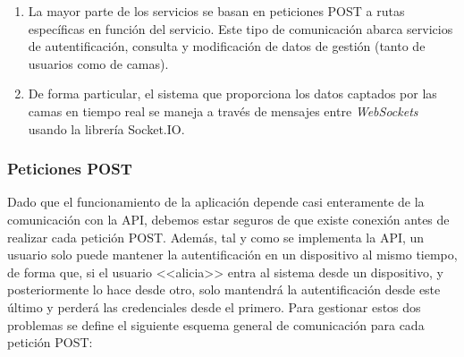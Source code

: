 \begin{enumerate}
	\item La mayor parte de los servicios se basan en peticiones POST a rutas específicas en función del servicio. Este tipo de comunicación abarca servicios de autentificación, consulta y modificación de datos de gestión (tanto de usuarios como de camas). 
	\item De forma particular, el sistema que proporciona los datos captados por las camas en tiempo real se maneja a través de mensajes entre \textit{WebSockets} usando la librería Socket.IO. 
\end{enumerate}

\subsubsection{Peticiones POST}
Dado que el funcionamiento de la aplicación depende casi enteramente de la comunicación con la API, debemos estar seguros de que existe conexión antes de realizar cada petición POST. Además, tal y como se implementa la API, un usuario solo puede mantener la autentificación en un dispositivo al mismo tiempo, de forma que, si el usuario <<alicia>> entra al sistema desde un dispositivo, y posteriormente lo hace desde otro, solo mantendrá la autentificación desde este último y perderá las credenciales desde el primero. Para gestionar estos dos problemas se define el siguiente esquema general de comunicación para cada petición POST:  

